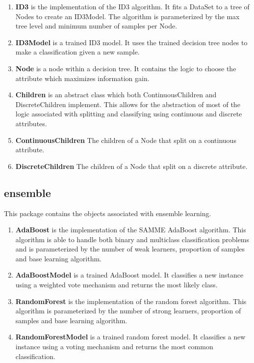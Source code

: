 \documentclass[11pt]{article}
\newcommand{\bb}{\textbf}
\begin{document}
\begin{enumerate}[leftmargin=*]
  \item[] \bb{ID3} is the implementation of the ID3 algorithm. It fits a DataSet to a tree of Nodes to create an ID3Model. The algorithm is parameterized by the max tree level and minimum number of samples per Node.
  \item[] \bb{ID3Model} is a trained ID3 model. It uses the trained decision tree nodes to make a classification given a new sample.
  \item[] \bb{Node} is a node within a decision tree. It contains the logic to choose the attribute which maximizes information gain.
  \item[] \bb{Children} is an abstract class which both ContinuousChildren and DiscreteChildren implement. This allows for the abstraction of most of the logic associated with splitting and classifying using continuous and discrete attributes.
  \item[] \bb{ContinuousChildren} The children of a Node that split on a continuous attribute.
  \item[] \bb{DiscreteChildren} The children of a Node that split on a discrete attribute.
\end{enumerate}

\subsection{ensemble}
This package contains the objects associated with ensemble learning.

\begin{enumerate}[leftmargin=*]
  \item[] \bb{AdaBoost} is the implementation of the SAMME AdaBoost algorithm. This algorithm is able to handle both binary and multiclass classification problems and is parameterized by the number of weak learners, proportion of samples and base learning algorithm.
  \item[] \bb{AdaBoostModel} is a trained AdaBoost model. It classifies a new instance using a weighted vote mechanism and returns the most likely class.
  \item[] \bb{RandomForest} is the implementation of the random forest algorithm. This algorithm is parameterized by the number of strong learners, proportion of samples and base learning algorithm.
  \item[] \bb{RandomForestModel} is a trained random forest model. It classifies a new instance using a voting mechanism and returns the most common classification.
\end{enumerate}
\end{document}
